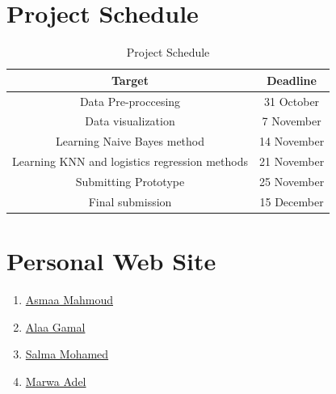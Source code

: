 \documentclass[a4paper, 11pt, oneside]{article} %
\begin{document}
\section{Project Schedule}
\begin{table}[ht]
\caption{Project Schedule} %
\centering %
\begin{tabular}{c c } %
\hline\hline %
Target & Deadline \\ [0.5ex] %
\hline %
Data Pre-proccesing & 31 October \\ %
Data visualization & 7 November \\
Learning Naive Bayes method & 14 November  \\
Learning KNN and logistics regression methods   & 21 November \\
Submitting Prototype & 25 November \\
Final submission & 15 December \\ [1ex] %
\hline %
\end{tabular}
\label{table:nonlin} %
\end{table}
\vfil
\section{Personal Web Site}
\begin{enumerate}
\item \href{https://asmaamahmoud12.github.io/Asmaa-Mahmoud/}{Asmaa Mahmoud}
\item \href{https://alaagamal98.github.io/}{Alaa Gamal}
\item \href{https://salmazakariia.github.io/SalmaZakaria/}{Salma Mohamed}
\item \href{https://marwaayosiif.github.io/MarwaYoussif/}{Marwa Adel}
\end{enumerate}
\end{document}
